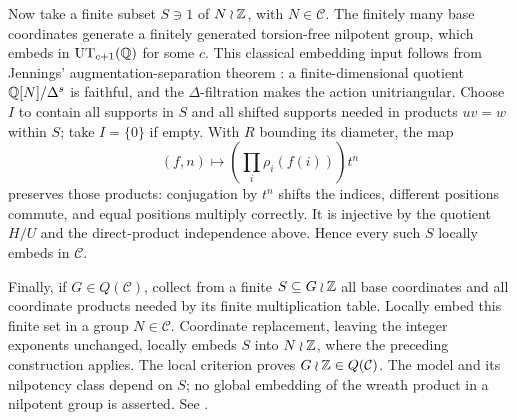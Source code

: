 Now take a finite subset \(S\ni1\) of \(N\wr\mathbb Z\), with
\(N\in\mathcal C\).
The finitely many base coordinates generate a finitely generated
torsion-free nilpotent group, which embeds in
\(\mathrm{UT}_{c+1}(\mathbb Q)\) for some \(c\).
This classical embedding input follows from Jennings'
augmentation-separation theorem \cite[Theorem~5.2]{jennings}:
a finite-dimensional quotient \(\mathbb Q[N]/\Delta^s\) is faithful,
and the \(\Delta\)-filtration makes the action unitriangular.
Choose \(I\) to contain all supports in \(S\) and all shifted supports
needed in products \(uv=w\) within \(S\); take \(I=\{0\}\) if empty.
With \(R\) bounding its diameter, the map
\[
 (f,n)\longmapsto\left(\prod_i\rho_i(f(i))\right)t^n
\]
preserves those products: conjugation by \(t^n\) shifts the indices,
different positions commute, and equal positions multiply correctly.
It is injective by the quotient \(H/U\) and the direct-product
independence above. Hence every such \(S\) locally embeds in \(\mathcal C\).

Finally, if \(G\in Q(\mathcal C)\), collect from a finite
\(S\subseteq G\wr\mathbb Z\) all base coordinates and all coordinate products
needed by its finite multiplication table.
Locally embed this finite set in a group \(N\in\mathcal C\).
Coordinate replacement, leaving the integer exponents unchanged,
locally embeds \(S\) into \(N\wr\mathbb Z\), where the preceding construction
applies. The local criterion proves \(G\wr\mathbb Z\in Q(\mathcal C)\).
The model and its nilpotency class depend on \(S\); no global
embedding of the wreath product in a nilpotent group is asserted.
See .
